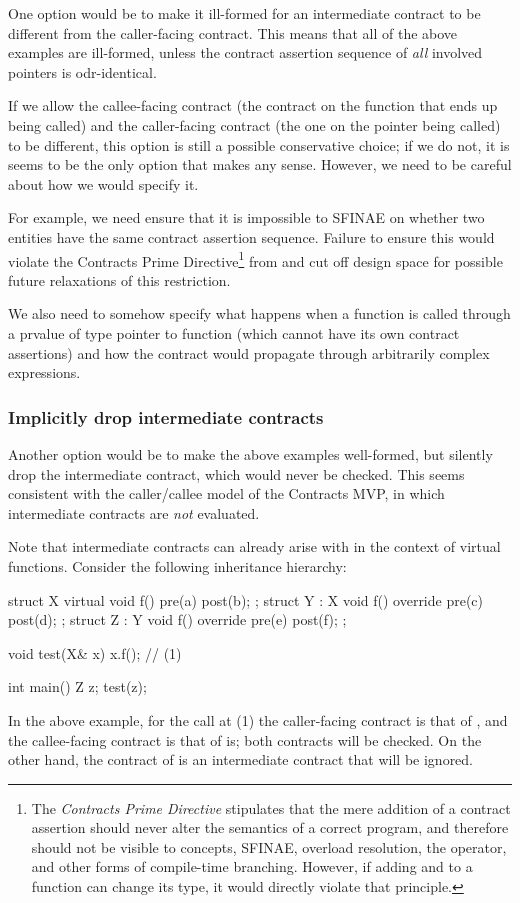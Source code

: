 One option would be to make it ill-formed for an intermediate contract to be different from the caller-facing contract. This means that all of the above examples are ill-formed, unless the contract assertion sequence of \emph{all} involved pointers is odr-identical.

If we allow the callee-facing contract (the contract on the function that ends up being called) and the caller-facing contract (the one on the pointer being called) to be different, this option is still a possible conservative choice; if we do not, it is seems to be the only option that makes any sense. However, we need to be careful about how we would specify it.

For example, we need ensure that it is impossible to SFINAE on whether two entities have the same contract assertion sequence. Failure to ensure this would violate the Contracts Prime Directive\footnote{The \emph{Contracts Prime Directive} stipulates that the mere addition of a contract assertion should never alter the semantics of a correct program, and therefore should not be visible to concepts, SFINAE, overload resolution, the  operator, and other forms of compile-time branching. However, if adding  and  to a function can change its type, it would directly violate that principle.} from \cite{P2900R8} and cut off design space for possible future relaxations of this restriction.

We also need to somehow specify what happens when a function is called through a prvalue of type pointer to function (which cannot have its own contract assertions) and how the contract would propagate through arbitrarily complex expressions. 

\subsubsection{Implicitly drop intermediate contracts}
\label{implicitdrop}

Another option would be to make the above examples well-formed, but silently drop the intermediate contract, which would never be checked. This seems consistent with the caller/callee model of the Contracts MVP, in which intermediate contracts are \emph{not} evaluated. 

Note that intermediate contracts can already arise with \cite{P2900R8} in the context of virtual functions. Consider the following inheritance hierarchy:
\begin{codeblock}
struct X {
  virtual void f() pre(a) post(b);
};
struct Y : X {
  void f() override pre(c) post(d);
};
struct Z : Y {
  void f() override pre(e) post(f);
};

void test(X& x) {
  x.f();  // (1)
}

int main() {
  Z z;
  test(z);
}
\end{codeblock}
In the above example, for the call at (1) the caller-facing contract is that of , and the callee-facing contract is that of  is; both contracts will be checked. On the other hand, the contract of  is an intermediate contract that will be ignored.

